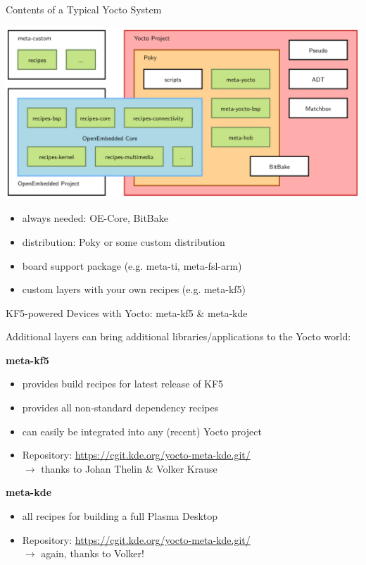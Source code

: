 \documentclass[ucs,9pt]{beamer}
\begin{document}
\begin{frame}
    {Contents of a Typical Yocto System}

    \begin{center}
    \includegraphics[width=.8\linewidth]{images/yocto-bsp}
    \end{center}
    \begin{itemize}
        \item always needed: OE-Core, BitBake
        \item distribution: Poky or some custom distribution
        \item board support package (e.g. meta-ti, meta-fsl-arm)
        \item custom layers with your own recipes (e.g. meta-kf5)
    \end{itemize}
\end{frame}

\begin{frame}
    {KF5-powered Devices with Yocto: meta-kf5 \& meta-kde}

    Additional layers can bring additional libraries/applications to the Yocto world:
    \medskip

    \textbf{meta-kf5}
    \begin{itemize}
        \item provides build recipes for latest release of KF5
        \item provides all non-standard dependency recipes
        \item can easily be integrated into any (recent) Yocto project
        \item Repository: \url{https://cgit.kde.org/yocto-meta-kde.git/}\\
            $\rightarrow$ thanks to Johan Thelin \& Volker Krause
    \end{itemize}

    \textbf{meta-kde}
    \begin{itemize}
        \item all recipes for building a full Plasma Desktop
        \item Repository: \url{https://cgit.kde.org/yocto-meta-kde.git/}\\
            $\rightarrow$ again, thanks to Volker!
    \end{itemize}
\end{frame}
\end{document}
